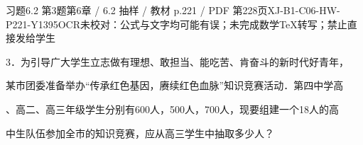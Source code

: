 \begin{bankitem}{习题6.2 第3题}{第6章 / 6.2 抽样 / 教材 p.221 / PDF 第228页}{XJ-B1-C06-HW-P221-Y1395}{OCR未校对：公式与文字均可能有误；未完成数学TeX转写；禁止直接发给学生}
\begin{ocrdraft}
\par
3．为引导广大学生立志做有理想、敢担当、能吃苦、肯奋斗的新时代好青年，
\par
某市团委准备举办“传承红色基因，赓续红色血脉”知识竞赛活动．第四中学高
\par
、高二、高三年级学生分别有600人，500人，700人，现要组建一个18人的高
\par
中生队伍参加全市的知识竞赛，应从高三学生中抽取多少人？
\end{ocrdraft}
\end{bankitem}
